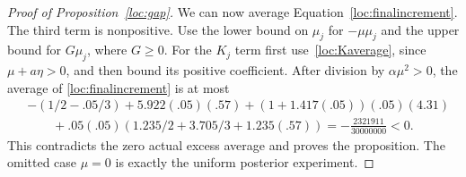 \begin{proof}[Proof of Proposition~\ref{loc:gap}]
We can now average Equation~\eqref{loc:finalincrement}.
The third term is nonpositive.  Use the lower bound on $\mu_j$ for
$-\mu\mu_j$ and the upper bound for $G\mu_j$, where $G\ge0$.
For the $K_j$ term first use~\eqref{loc:Kaverage}, since
$\mu+a\eta>0$, and then bound its positive coefficient.
After division by $\alpha\mu^2>0$, the average of
\eqref{loc:finalincrement} is at most
\begin{align*}
 &-(1/2-.05/3)+5.922(.05)(.57)
       +(1+1.417(.05))(.05)(4.31)\\
 &\hspace{2em}+.05(.05)(1.235/2+3.705/3+1.235(.57))
       =-\frac{2321911}{30000000}<0.
\end{align*}
This contradicts the zero actual excess average and proves the
proposition.  The omitted case $\mu=0$ is exactly the uniform posterior
experiment.
\end{proof}
